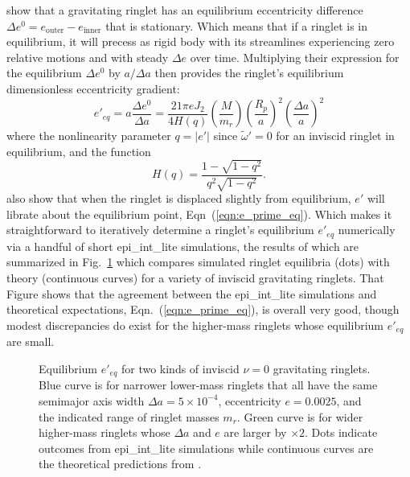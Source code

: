 \documentclass[preprint]{aastex62}
\begin{document}
\cite{BGT83AJpaper} show that a gravitating ringlet has an equilibrium eccentricity difference 
$\Delta e^0=e_\text{outer} - e_\text{inner}$ that is stationary. 
Which means that if a ringlet is in equilibrium,
it will precess as rigid body with its streamlines experiencing zero relative motions and with steady $\Delta e$ over time.
Multiplying their expression for the equilibrium $\Delta e^0$ by $a/\Delta a$
then provides the ringlet's equilibrium dimensionless eccentricity gradient:
\begin{equation}
    \label{eqn:e_prime_eq}
    e'_{eq} = a\frac{\Delta e^0}{\Delta a} = \frac{21\pi eJ_2}{4H(q)}\left(\frac{M}{m_r}\right)\left(\frac{R_p}{a}\right)^2
        \left(\frac{\Delta a}{a}\right)^2
\end{equation}
where the nonlinearity parameter $q=|e'|$ since $\tilde{\omega}'=0$ for an inviscid ringlet in equilibrium, and the function
\begin{equation}
    \label{eqn:H(q)}
    H(q) = \frac{1 - \sqrt{1-q^2}}{q^2\sqrt{1-q^2}}. 
\end{equation}
\cite{BGT83AJpaper} also show that when the ringlet is displaced slightly from equilibrium, $e'$ will librate about
the equilibrium point, Eqn\ (\ref{eqn:e_prime_eq}). Which makes it straightforward to iteratively determine
a ringlet's equilibrium $e'_{eq}$ numerically via a handful of short epi\_int\_lite simulations, the results of which are 
summarized in Fig.\ \ref{fig:equilibrium} which compares simulated ringlet 
equilibria (dots) with theory (continuous curves) 
for a variety of inviscid gravitating ringlets. That Figure shows that the agreement between the epi\_int\_lite simulations
and theoretical expectations, Eqn.\ (\ref{eqn:e_prime_eq}), is overall very good, 
though modest discrepancies do exist for the higher-mass ringlets whose equilibrium $e'_{eq}$ are small.

\begin{figure}
    \caption{
        \label{fig:equilibrium}
        Equilibrium $e'_{eq}$ for two kinds of inviscid $\nu=0$ gravitating ringlets. Blue curve is for narrower lower-mass
        ringlets that all have the same semimajor axis width $\Delta a=5\times10^{-4}$, eccentricity $e=0.0025$, and the indicated
        range of ringlet masses $m_r$. Green curve is for wider higher-mass ringlets whose $\Delta a$ and $e$ are 
        larger by $\times2$. 
        Dots indicate outcomes from epi\_int\_lite simulations while continuous curves are the theoretical
        predictions from \cite{BGT83AJpaper}.
    }
\end{figure}
\end{document}
